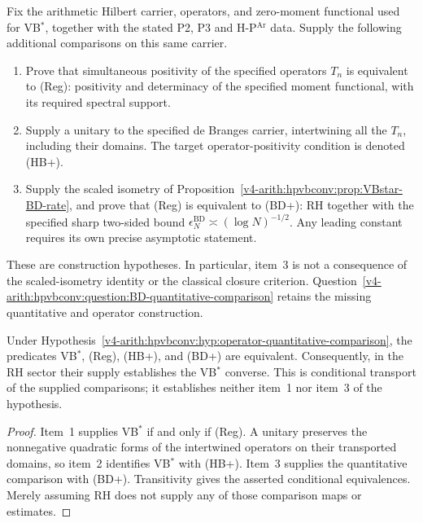 \begin{hypothesis}
\label{v4-arith:hpvbconv:hyp:operator-quantitative-comparison}
Fix the arithmetic Hilbert carrier, operators, and zero-moment
functional used for VB\(^{*}\), together with the stated
P2, P3 and H-P\(^{\mathrm{Ar}}\) data. Supply the following
additional comparisons on this same carrier.
\begin{enumerate}
\item Prove that simultaneous positivity of the specified
operators \(T_n\) is equivalent to (Reg): positivity and determinacy
of the specified moment functional, with its required spectral support.
\item Supply a unitary to the specified de Branges carrier,
intertwining all the \(T_n\), including their domains. The target
operator-positivity condition is denoted (HB+).
\item Supply the scaled isometry of
Proposition~\ref{v4-arith:hpvbconv:prop:VBstar-BD-rate}, and prove
that (Reg) is equivalent to (BD+): RH together with the specified
sharp two-sided bound \(\epsilon_N^{\mathrm{BD}}\asymp(\log N)^{-1/2}\).
Any leading constant requires its own precise asymptotic statement.
\end{enumerate}
These are construction hypotheses. In particular, item~3 is not a
consequence of the scaled-isometry identity or the classical closure
criterion. Question~\ref{v4-arith:hpvbconv:question:BD-quantitative-comparison}
retains the missing quantitative and operator construction.
\end{hypothesis}

\begin{theorem}
\label{v4-arith:hpvbconv:thm:VBstar-converse-spectral-regularity}
\label{v4-arith:hpvbconv:thm:VBstar-de-branges-BD}
Under Hypothesis~\ref{v4-arith:hpvbconv:hyp:operator-quantitative-comparison},
the predicates VB\(^{*}\), (Reg), (HB+), and (BD+) are equivalent.
Consequently, in the RH sector their supply establishes the
VB\(^{*}\) converse. This is conditional transport of the supplied
comparisons; it establishes neither item~1 nor item~3 of the hypothesis.
\end{theorem}
\begin{proof}
Item~1 supplies VB\(^{*}\) if and only if (Reg). A unitary preserves
the nonnegative quadratic forms of the intertwined operators on
their transported domains, so item~2 identifies VB\(^{*}\) with (HB+).
Item~3 supplies the quantitative comparison with (BD+). Transitivity
gives the asserted conditional equivalences. Merely assuming RH
does not supply any of those comparison maps or estimates.
\end{proof}

